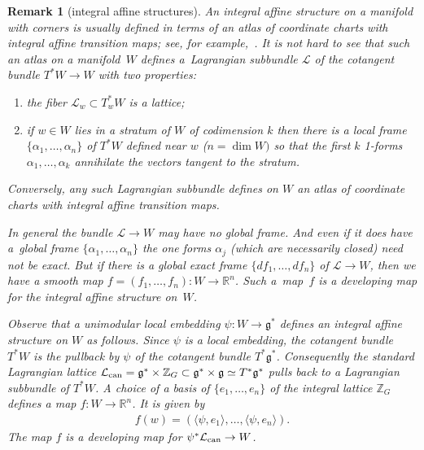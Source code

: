\documentclass[pdftex]{sigma}
\numberwithin{equation}{section}
\newtheorem{Remark}[Lemma]{Remark}
\begin{document}
\begin{Remark}[integral af\/f\/ine structures]
\label{add_rk:2}
An integral af\/f\/ine structure on a manifold with corners is usually
def\/ined in terms of an atlas of coordinate charts with integral af\/f\/ine
transition maps; see, for example,~\cite{Y}.  It is not hard to see
that such an atlas on a manifold~$W$ def\/ines  a~Lagrangian subbundle
${\mathcal L}$ of the cotangent bundle $T^*W\to W$ with two properties:
\begin{enumerate}[1)]\itemsep=0pt
\item the f\/iber ${\mathcal L}_w \subset T^*_wW$ is a lattice;
\item if $w\in W$ lies in a stratum of $W$ of
  codimension $k$ then there is a local frame $\{\alpha_1, \ldots,
  \alpha_n\}$ of $T^*W$ def\/ined near $w$ ($n=\dim W)$ so that the
  f\/irst $k$ 1-forms $\alpha_1,\ldots, \alpha_k$ annihilate the vectors
  tangent to the stratum.
\end{enumerate}
Conversely, any such Lagrangian subbundle def\/ines on $W$ an atlas of
coordinate charts with integral af\/f\/ine transition maps.

In general the  bundle ${\mathcal L}\to W$ may have no global
frame.  And even if it does have a~global frame $\{\alpha_1, \ldots,
\alpha_n\}$ the one forms $\alpha_j$ (which are necessarily closed)
need not be exact.  But if there is a global exact frame
$\{df_1,\ldots, df_n\}$ of ${\mathcal L}\to W$, then we have a smooth map
$f=(f_1,\ldots, f_n)\colon W\to {\mathbb R}^n$.  Such a~map~$f$ is a developing
map for the integral af\/f\/ine structure on~$W$.

Observe that a unimodular local embedding $\psi\colon W\to {\mathfrak g}^*$
def\/ines an integral af\/f\/ine structure on $W$ as follows. Since $\psi$
is a local embedding, the cotangent bundle $T^*W$ is the pullback by
$\psi$ of the cotangent bundle $T^*{\mathfrak g}^*$.  Consequently the standard
Lagrangian lattice ${\mathcal L}_{\rm can} ={\mathfrak g}^* \times {\mathbb Z}_G \subset {\mathfrak g}^*
\times {\mathfrak g}\simeq T^*{\mathfrak g}^*$ pulls back to a Lagrangian subbundle of
$T^*W$.  A choice of a basis of $\{e_1,\ldots, e_n\}$ of the integral
lattice ${\mathbb Z}_G$ def\/ines a map $f\colon W\to {\mathbb R}^n$.  It is given by
\begin{gather*}
f(w) = (\langle \psi, e_1\rangle, \ldots, \langle \psi, e_n\rangle).
\end{gather*}
The map $f$ is a developing map for $\psi^*{\mathcal L}_{\rm can}\to W$.
\end{Remark}
\end{document}
